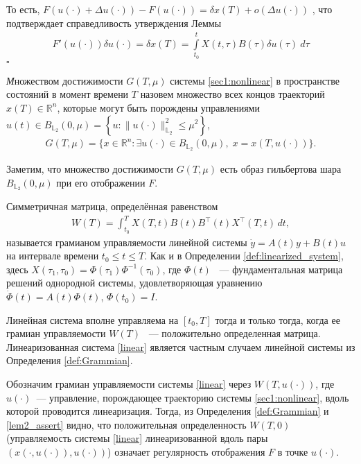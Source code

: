 \documentclass[../main.tex]{subfiles}
\begin{document}
	То есть, $F(u(\cdot) + \Delta u(\cdot)) - F(u(\cdot)) = \delta x(T) + o(\Delta u(\cdot))$ , что подтверждает справедливость утверждения Леммы
	\begin{gather}\label{lem2_assert}
		  F'(u(\cdot))\delta u(\cdot) =\delta x(T) = \int\limits_{t_0}^{t} X(t, \tau) B(\tau) \delta u(\tau) \ d\tau
	\end{gather}
	\hfill $\square$
	
	\begin{definition}
		{\textit  Множеством достижимости} $ G(T,\mu) $ системы \eqref{sec1:nonlinear} в пространстве состояний в момент времени $ T $ назовем множество всех концов траекторий $ x(T) \in \mathbb{R}^n $,  которые могут быть порождены управлениями	$ u(t) \in B_{\mathbb{L}_2}(0,\mu) =\left\lbrace u:\lVert u(\cdot)\rVert^2_{\mathbb{L}_2} \leqslant \mu^2\right\rbrace  $,
		\begin{gather*}
			G(T,\mu)=\{x\in \mathbb{R}^n:\exists u(\cdot)\in B_{\mathbb{L}_2}(0,\mu),\; x=x(T,u(\cdot))\}.
		\end{gather*}
	\end{definition}
	
	Заметим, что множество достижимости $G(T,\mu)$ есть образ гильбертова шара $B_{\mathbb{L}_2}(0,\mu)$ при его отображении $F$.
	
	\begin{definition}\label{def:Grammian}
		Симметричная матрица, определённая равенством
		\begin{gather*}
			W(T) = \int_{t_0}^{T}X(T,t)B(t)B^{\top}(t)X^{\top}(T,t) \, dt,
		\end{gather*}
		называется грамианом управляемости линейной системы $\dot{y} = A(t) y + B(t) u $ на интервале времени $  t_0 \leqslant t \leqslant T $. Как и в Определении \ref{def:linearized_system}, здесь $ X(\tau_1,\tau_0)= \Phi(\tau_1) \Phi^{-1}(\tau_0) $, где $\Phi(t) $ ~--- фундаментальная матрица решений однородной системы, удовлетворяющая уравнению $ \dot{\Phi}(t) = A(t) \Phi(t)$, $ \Phi(t_0) = I $.
	\end{definition}
	
	 Линейная система вполне управляема на  $ [t_0, T] $ тогда и только тогда, когда ее грамиан управляемости $W(T)$ ~--- положительно определенная матрица. Линеаризованная система \eqref{linear} является частным случаем линейной системы из Определения \ref{def:Grammian}. 
	 
	 Обозначим грамиан управляемости системы \eqref{linear} через $W(T,u(\cdot))$, где $u(\cdot)$~--- управление, порождающее траекторию системы \eqref{sec1:nonlinear}, вдоль которой проводится линеаризация. Тогда, из Определения \ref{def:Grammian} и \eqref{lem2_assert} видно, что положительная определенность $W(T,0)$ (управляемость системы \eqref{linear} линеаризованной вдоль пары $\left( x(\cdot,u(\cdot)),u(\cdot)\right)   $) означает регулярность отображения $F$ в точке $u(\cdot) $. 
	
\end{document}
